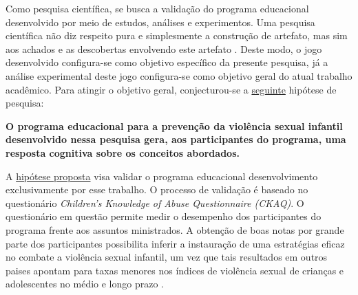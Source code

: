 
Como pesquisa científica, se busca a validação do programa educacional desenvolvido por meio de estudos, análises e experimentos. Uma pesquisa científica não diz respeito pura e simplesmente a construção de artefato, mas sim aos achados e as descobertas envolvendo este artefato \cite{wazlawick2014metodologia}. Deste modo, o jogo desenvolvido configura-se como objetivo específico da presente pesquisa, já a análise experimental deste jogo configura-se como objetivo geral do atual trabalho acadêmico. Para atingir o objetivo geral, conjecturou-se a \hyperref[hipotese]{seguinte} hipótese de pesquisa: 


\vspace{0.6cm}

\vspace{-0.6cm}
\begin{framed}
  \textbf{O programa educacional para a prevenção da violência sexual infantil desenvolvido nessa pesquisa gera, aos participantes do programa, uma resposta cognitiva sobre os conceitos abordados.} 
\end{framed}


\vspace{-0.2cm}

A \hyperref[hipotese]{hipótese proposta} visa validar o programa educacional desenvolvimento exclusivamente por esse trabalho. O processo de validação é baseado no questionário \textit{Children’s Knowledge of Abuse Questionnaire (CKAQ)}. 
O questionário em questão permite medir o desempenho dos participantes do programa frente aos assuntos ministrados. A obtenção de boas notas por grande parte dos participantes possibilita inferir a instauração de uma estratégias eficaz no combate a violência sexual infantil, um vez que tais resultados em outros paises apontam para taxas menores nos índices de violência sexual de crianças e adolescentes no médio e longo prazo \cite{finkelhor2009prevention}. 



